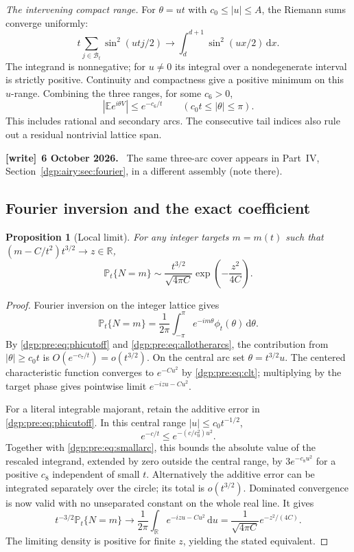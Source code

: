 \documentclass[11pt,letterpaper]{article}
\numberwithin{equation}{section}
\newtheorem{proposition}[theorem]{Proposition}
\theoremstyle{remark}\newtheorem{remark}[theorem]{Remark}
\newcommand{\PP}{\mathbb P}
\newcommand{\EE}{\mathbb E}
\newcommand{\dd}{\,\mathrm d}
\newenvironment{writenote}[1][]{\par\smallskip\begingroup\small
 \noindent\textbf{[write]}\if\relax\detokenize{#1}\relax\else~\textbf{#1.}\fi\ }%
 {\par\endgroup\smallskip}
\begin{document}
\emph{The intervening compact range.} For $\theta=ut$ with
$c_0\leq|u|\leq A$, the Riemann sums converge uniformly:
\begin{equation}
 t\sum_{j\in\mathcal B_t}\sin^2(utj/2)
 \longrightarrow \int_d^{d+1}\sin^2(ux/2)\dd x.
 \label{dgp:pre:eq:middlearc}
\end{equation}
The integrand is nonnegative; for $u\ne0$ its integral over a
nondegenerate interval is strictly positive. Continuity and compactness
give a positive minimum on this $u$-range. Combining the three ranges,
for some $c_6>0$,
\begin{equation}
 |\EE e^{i\theta V}|\leq e^{-c_6/t}
       \qquad(c_0t\leq|\theta|\leq\pi).
 \label{dgp:pre:eq:allotherarcs}
\end{equation}
This includes rational and secondary arcs. The consecutive tail
indices also rule out a residual nontrivial lattice span.
\begin{writenote}[6 October 2026]
The same three-arc cover appears in Part~IV, Section~\ref{dgp:airy:sec:fourier}, in a different assembly (note there).
\end{writenote}

\subsection{Fourier inversion and the exact coefficient}
\begin{proposition}[Local limit]\label{dgp:pre:prop:llt}
For any integer targets $m=m(t)$ such that
$(m-C/t^2)t^{3/2}\to z\in\mathbb R$,
\begin{equation}
 \PP_t\{N=m\}\sim\frac{t^{3/2}}{\sqrt{4\pi C}}
                           \exp\left(-\frac{z^2}{4C}\right).
 \label{dgp:pre:eq:llt}
\end{equation}
\end{proposition}
\begin{proof}
Fourier inversion on the integer lattice gives
\[
 \PP_t\{N=m\}=\frac1{2\pi}\int_{-\pi}^{\pi}
                   e^{-im\theta}\phi_t(\theta)\dd\theta.
\]
By \eqref{dgp:pre:eq:phicutoff} and \eqref{dgp:pre:eq:allotherarcs}, the contribution
from $|\theta|\geq c_0t$ is $O(e^{-c_7/t})=o(t^{3/2})$.
On the central arc set $\theta=t^{3/2}u$. The centered characteristic
function converges to $e^{-Cu^2}$ by \eqref{dgp:pre:eq:clt}; multiplying by
the target phase gives pointwise limit $e^{-izu-Cu^2}$.

For a literal integrable majorant, retain the additive error in
\eqref{dgp:pre:eq:phicutoff}. In this central range $|u|\leq c_0t^{-1/2}$,
\[
 e^{-c/t}\leq e^{-(c/c_0^2)u^2}.
\]
Together with \eqref{dgp:pre:eq:smallarc}, this bounds the absolute value of
the rescaled integrand, extended by zero outside the central range,
by $3e^{-c_8u^2}$ for a positive $c_8$ independent of small $t$.
Alternatively the additive error can be integrated separately over
the circle; its total is $o(t^{3/2})$. Dominated convergence is now
valid with no unseparated constant on the whole real line. It gives
\[
 t^{-3/2}\PP_t\{N=m\}\longrightarrow
 \frac1{2\pi}\int_{\mathbb R}e^{-izu-Cu^2}\dd u
 =\frac1{\sqrt{4\pi C}}e^{-z^2/(4C)}.
\]
The limiting density is positive for finite $z$, yielding the stated
equivalent.
\end{proof}
\end{document}
